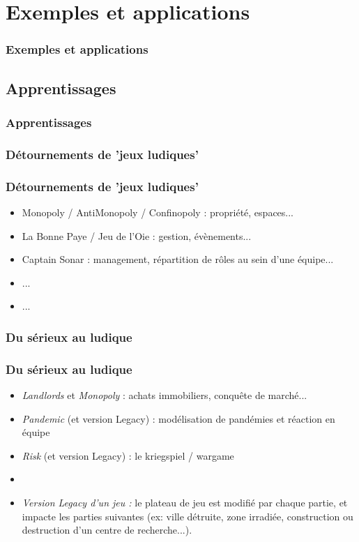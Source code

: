 \documentclass[slidetop,11pt]{beamer}
\begin{document}
\section{Exemples et applications}
\begin{frame}
	\frametitle{Exemples et applications}
	\tableofcontents[sections=4,currentsection,subsectionstyle=show/shaded/hide] %
\end{frame} 

\subsection{Apprentissages}
\begin{frame}
	\frametitle{Apprentissages}
	\tableofcontents[sections=4,currentsection,subsectionstyle=show/shaded/hide]
\end{frame} 

\subsubsection{D{\'e}tournements de 'jeux ludiques'}
\begin{frame}
	\frametitle{D{\'e}tournements de 'jeux ludiques'}
	\begin{itemize}
		\item Monopoly / AntiMonopoly / Confinopoly : propri{\'e}t{\'e}, espaces...
		\item La Bonne Paye / Jeu de l'Oie  : gestion, {\'e}v{\`e}nements... 
		\item Captain Sonar : management, r{\'e}partition de r{\^o}les au sein d'une {\'e}quipe... 
		\item ... 
		\item ... 
	\end{itemize}
\end{frame} 

\subsubsection{Du s{\'e}rieux au ludique}
\begin{frame}
	\frametitle{Du s{\'e}rieux au ludique}
	\begin{itemize}
		\item \emph{Landlords} et \emph{Monopoly} : achats immobiliers, conqu{\^e}te de march{\'e}...
		\item \emph{Pandemic} (et version Legacy) : mod{\'e}lisation de pand{\'e}mies et r{\'e}action en {\'e}quipe
		\item \emph{Risk} (et version Legacy) : le kriegspiel / wargame
		\item[] 
		\item \emph{Version Legacy d'un jeu : }le plateau de jeu est modifi{\'e} par chaque partie, et impacte les parties suivantes (ex: ville d{\'e}truite, zone irradi{\'e}e, construction ou destruction d'un centre de recherche...). 
	\end{itemize}
\end{frame} 
\end{document}
